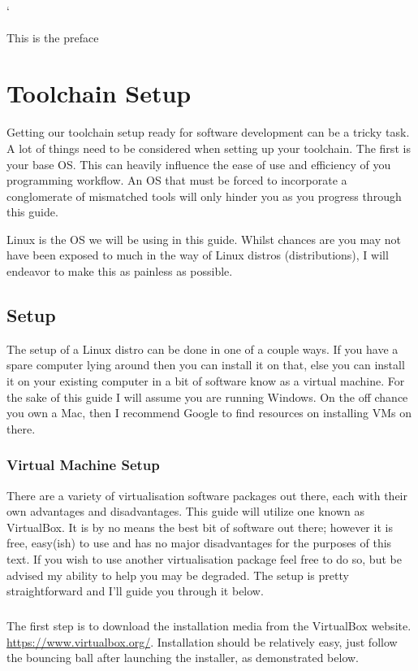 `\documentclass[a4paper,11pt]{report}
\begin{document}
This is the preface

\chapter{Toolchain Setup}
  \label{ch:ToolchainSetup}
  Getting our toolchain setup ready for software development can be a tricky task.
  A lot of things need to be considered when setting up your toolchain. The first is your base OS.
  This can heavily influence the ease of use and efficiency of you programming workflow.
  An OS that must be forced to incorporate a conglomerate of mismatched tools will only hinder you as you progress through this guide.

  Linux is the OS we will be using in this guide.
	Whilst chances are you may not have been exposed to much in the way of Linux distros (distributions), I will endeavor to make this as painless as possible.

  \section{Setup}

  The setup of a Linux distro can be done in one of a couple ways.
	If you have a spare computer lying around then you can install it on that, else you can install it on your existing computer in a bit of software know as a virtual machine.
  For the sake of this guide I will assume you are running Windows.
	On the off chance you own a Mac, then I recommend Google to find resources on installing VMs on there.

  \subsection{Virtual Machine Setup}
    There are a variety of virtualisation software packages out there, each with their own advantages and disadvantages.
    This guide will utilize one known as VirtualBox. It is by no means the best bit of software out there; however it is free, easy(ish) to use and has no major disadvantages for the purposes of this text.
    If you wish to use another virtualisation package feel free to do so, but be advised my ability to help you may be degraded.
    The setup is pretty straightforward and I'll guide you through it below.
    \paragraph{}
    The first step is to download the installation media from the VirtualBox website. \url{https://www.virtualbox.org/}.
		Installation should be relatively easy, just follow the bouncing ball after launching the installer, as demonstrated below.
\end{document}
